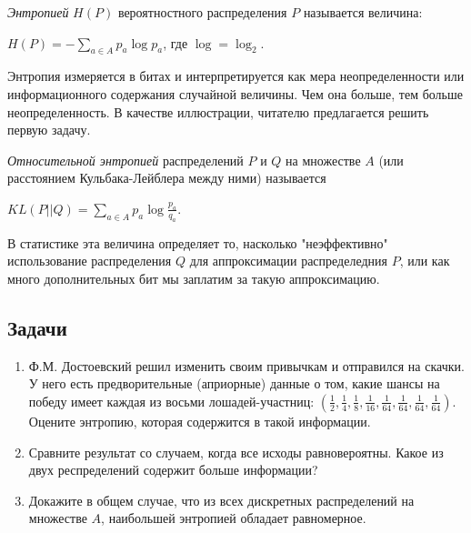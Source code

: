 \begin{definition} 
\textit{Энтропией} $H(P)$ вероятностного распределения $P$ называется величина:
\begin{center}
$H(P) = - \sum_{a \in A} p_a\log p_a$, где $\log = \log_2$.
\end{center}
Энтропия измеряется в битах и интерпретируется как мера неопределенности или информационного содержания случайной величины. Чем она больше, тем больше неопределенность. В качестве иллюстрации, читателю предлагается решить первую задачу.
\end{definition}

\begin{definition}
\textit{Относительной энтропией} распределений $P$ и $Q$ на множестве $A$ (или расстоянием Кульбака-Лейблера между ними) называется
\begin{center}
$KL(P||Q) = \sum_{a \in A} p_a \log \frac{p_a}{q_a}$. 
\end{center}
В статистике эта величина определяет то, насколько "неэффективно" использование распределения $Q$ для аппроксимации распределедния $P$, или как много дополнительных бит мы заплатим за такую аппроксимацию.
\end{definition}

\subsection{Задачи}

\begin{problem} 
\begin{enumerate}
\item Ф.М. Достоевский решил изменить своим привычкам и отправился на скачки. У него есть предворительные (априорные) данные о том, какие шансы на победу имеет каждая из восьми лошадей-участниц: $(\frac{1}{2}, \frac{1}{4}, \frac{1}{8}, \frac{1}{16}, \frac{1}{64}, \frac{1}{64}, \frac{1}{64}, \frac{1}{64})$. Оцените энтропию, которая содержится в такой информации. 
\item Сравните результат со случаем, когда все исходы равновероятны. Какое из двух респределений содержит больше информации?
\item Докажите в общем случае, что из всех дискретных распределений на множестве $A$, наибольшей энтропией обладает равномерное.
\end{enumerate}
\end{problem}

